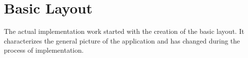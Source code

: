 %
\newpage
\section{Basic Layout}
The actual implementation work started with the creation of the basic layout. It characterizes the general picture of the application and has changed during the process of implementation.

